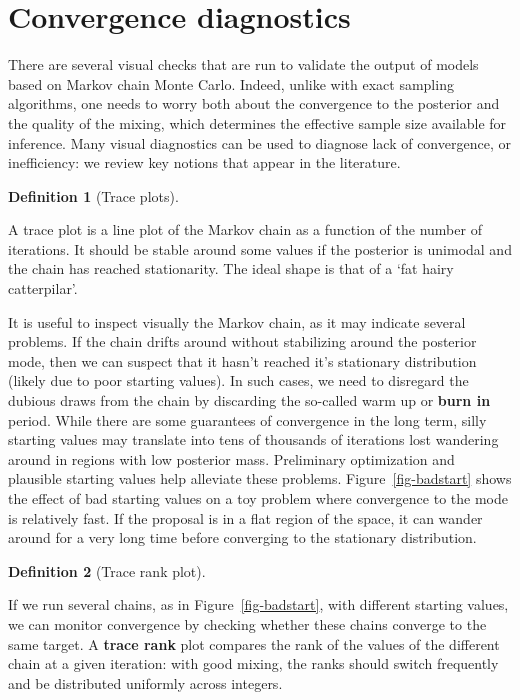 \documentclass[
  11pt,
  letterpaper,
]{scrbook}
\theoremstyle{definition}
\theoremstyle{plain}
\theoremstyle{plain}
\theoremstyle{plain}
\theoremstyle{definition}
\theoremstyle{definition}
\newtheorem{definition}{Definition}[chapter]
\theoremstyle{plain}
\theoremstyle{plain}
\theoremstyle{remark}
\begin{document}
\section{Convergence diagnostics}\label{convergence-diagnostics}

There are several visual checks that are run to validate the output of
models based on Markov chain Monte Carlo. Indeed, unlike with exact
sampling algorithms, one needs to worry both about the convergence to
the posterior and the quality of the mixing, which determines the
effective sample size available for inference. Many visual diagnostics
can be used to diagnose lack of convergence, or inefficiency: we review
key notions that appear in the literature.

\begin{definition}[Trace
plots]\protect\hypertarget{def-traceplots}{}\label{def-traceplots}

A trace plot is a line plot of the Markov chain as a function of the
number of iterations. It should be stable around some values if the
posterior is unimodal and the chain has reached stationarity. The ideal
shape is that of a `fat hairy catterpilar'.

\end{definition}

It is useful to inspect visually the Markov chain, as it may indicate
several problems. If the chain drifts around without stabilizing around
the posterior mode, then we can suspect that it hasn't reached it's
stationary distribution (likely due to poor starting values). In such
cases, we need to disregard the dubious draws from the chain by
discarding the so-called warm up or \textbf{burn in} period. While there
are some guarantees of convergence in the long term, silly starting
values may translate into tens of thousands of iterations lost wandering
around in regions with low posterior mass. Preliminary optimization and
plausible starting values help alleviate these problems.
Figure~\ref{fig-badstart} shows the effect of bad starting values on a
toy problem where convergence to the mode is relatively fast. If the
proposal is in a flat region of the space, it can wander around for a
very long time before converging to the stationary distribution.

\begin{definition}[Trace rank
plot]\protect\hypertarget{def-trankplot}{}\label{def-trankplot}

If we run several chains, as in Figure~\ref{fig-badstart}, with
different starting values, we can monitor convergence by checking
whether these chains converge to the same target. A \textbf{trace rank}
plot compares the rank of the values of the different chain at a given
iteration: with good mixing, the ranks should switch frequently and be
distributed uniformly across integers.

\end{definition}
\end{document}
